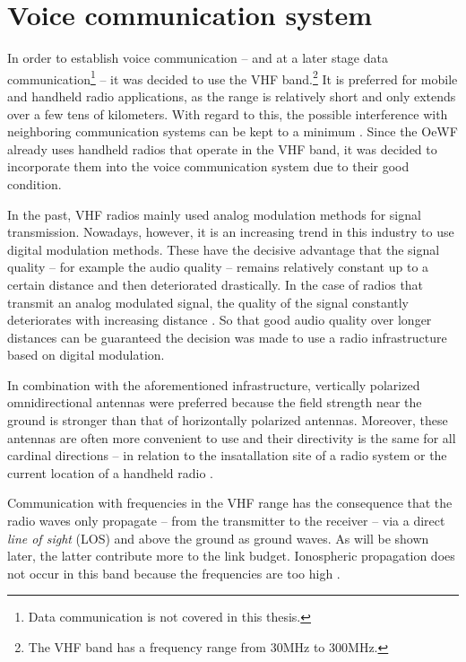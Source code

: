 \section{Voice communication system} \label{sec:link_budget}
In order to establish voice communication -- and at a later stage data communication\footnote{Data communication is not covered in this thesis.} -- it was decided to use the VHF band.\footnote{The VHF band has a frequency range from $30\mathrm{MHz}$ to $300\mathrm{MHz}$.} It is preferred for mobile and handheld radio applications, as the range is relatively short and only extends over a few tens of kilometers. With regard to this, the possible interference with neighboring communication systems can be kept to a minimum \cite{Parsons:2000}. Since the OeWF already uses handheld radios that operate in the VHF band, it was decided to incorporate them into the voice communication system due to their good condition.

In the past, VHF radios mainly used analog modulation methods for signal transmission. Nowadays, however, it is an increasing trend in this industry to use digital modulation methods. These have the decisive advantage that the signal quality -- for example the audio quality -- remains relatively constant up to a certain distance and then deteriorated drastically. In the case of radios that transmit an analog modulated signal, the quality of the signal constantly deteriorates with increasing distance \cite{SystemPlanner:2018}. So that good audio quality over longer distances can be guaranteed the decision was made to use a radio infrastructure based on digital modulation. 

In combination with the aforementioned infrastructure, vertically polarized omnidirectional antennas were preferred because the field strength near the ground is stronger than that of horizontally polarized antennas. Moreover, these antennas are often more convenient to use and their directivity is the same for all cardinal directions -- in relation to the insatallation site of a radio system or the current location of a handheld radio \cite{Parsons:2000}. 

Communication with frequencies in the VHF range has the consequence that the radio waves only propagate -- from the transmitter to the receiver -- via a direct \emph{line of sight} (LOS) and above the ground as ground waves. As will be shown later, the latter contribute more to the link budget. Ionospheric propagation does not occur in this band because the frequencies are too high \cite{Parsons:2000}. 

